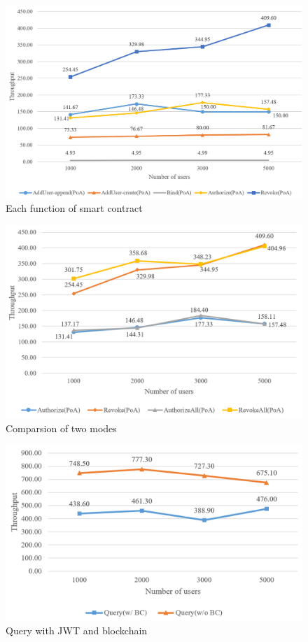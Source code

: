 \begin{figure}[htb]
    \centering
    \includegraphics[height=!,width=1\linewidth,keepaspectratio=true]{figures/smart_contract_tps.png}
    \caption{{\footnotesize Each function of smart contract}}
    \label{fig:contract_tps}
\end{figure}

\begin{figure}[htb]
    \centering
    \includegraphics[height=!,width=1\linewidth,keepaspectratio=true]{figures/authorize_comparsion.png}
    \caption{{\footnotesize Comparsion of two modes}}
    \label{fig:authorize_compare}
\end{figure}

\begin{figure}[htb]
    \centering
    \includegraphics[height=!,width=1\linewidth,keepaspectratio=true]{figures/query.png}
    \caption{{\footnotesize Query with JWT and blockchain}}
    \label{fig:query}
\end{figure}